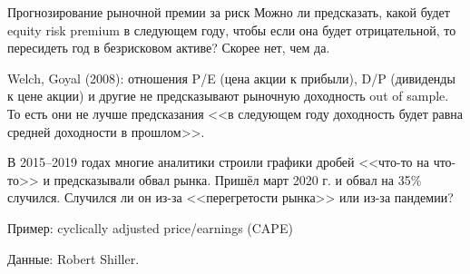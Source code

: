 \documentclass{beamer}
\begin{document}
\begin{frame}{Прогнозирование рыночной премии за риск}
\justify
Можно ли предсказать, какой будет equity risk premium в следующем году, чтобы если она будет отрицательной, то пересидеть год в безрисковом активе? Скорее нет, чем да.

\justify
Welch, Goyal (2008): отношения P/E (цена акции к прибыли), D/P (дивиденды к цене акции) и другие не предсказывают рыночную доходность out of sample. То есть они не лучше предсказания <<в следующем году доходность будет равна средней доходности в прошлом>>.

\justify
В 2015--2019 годах многие аналитики строили графики дробей <<что-то на что-то>> и предсказывали обвал рынка. Пришёл март 2020 г. и обвал на 35\% случился. Случился ли он из-за <<перегретости рынка>> или из-за пандемии?
\end{frame}



\begin{frame}{Пример: cyclically adjusted price/earnings (CAPE)}
\centering
{}
{\scriptsize Данные: Robert Shiller.}
\end{frame}
\end{document}
